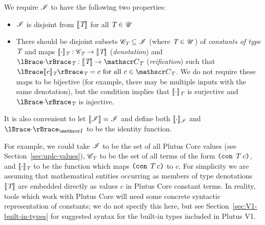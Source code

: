 \medskip
\noindent We require $\mathscr{I}$ to have the following two properties:
\begin{itemize}
\item $\mathscr{I}$ is disjoint from $\llbracket\mathit{\textit{T}}\rrbracket$ for all $\textit{T} \in \mathscr{U}$
\item There should be disjoint subsets $\mathscr{C}_{\textit{T}} \subseteq \mathscr{I}$ (where $\textit{T}
  \in \mathscr{U}$) of \textit{constants of type $\textit{T}$} and maps $\llbracket\mathit{\cdot}\rrbracket_{\textit{T}}:
  \mathscr{C}_{\textit{T}} \rightarrow \llbracket\mathit{\textit{T}}\rrbracket$ (\textit{denotation}) and
  $\reify{\cdot}_{\tn}: \denote{\tn} \rightarrow \Con{\tn}$
  (\textit{reification}) such that $\reify{\denote{c}_{\tn}}_{\tn} = c \text{
    for all } c \in \Con{\tn}$.  We do not require these maps to be bijective
  (for example, there may be multiple inputs with the same denotation), but the
  condition implies that $\llbracket\mathit{\cdot}\rrbracket_{\textit{T}}$ is surjective and
  $\reify{\cdot}_{\tn}$ is injective.
\end{itemize}%
%
%

\noindent It is also convenient to let $\llbracket\mathit{\mathscr{I}}\rrbracket = \mathscr{I}$ and define both
  $\llbracket\mathit{\cdot}\rrbracket_{\mathscr{I}}$ and $\reify{\cdot}_{\Inputs}$ to be the identity
  function.



\noindent For example, we could take $\mathscr{I}$ to be the set of all Plutus Core
values (see Section~\ref{sec:uplc-values}), $\mathscr{C}_{\textit{T}}$ to be the set of all
terms of the form $\texttt{(} \texttt{con} ~ \textit{T} ~ c \texttt{)}$, and $\llbracket\mathit{\cdot}\rrbracket_{\textit{T}}$ to be the function
which maps $\texttt{(} \texttt{con} ~ \textit{T} ~ c \texttt{)}$ to $c$.  For simplicity we are assuming that
mathematical entities occurring as members of type denotations $\llbracket\mathit{\textit{T}}\rrbracket$
are embedded directly as values $c$ in Plutus Core constant terms. In reality,
tools which work with Plutus Core will need some concrete syntactic
representation of constants; we do not specify this here, but see
Section~\ref{sec:V1-built-in-types} for suggested syntax for the built-in
types included in Plutus V1.



